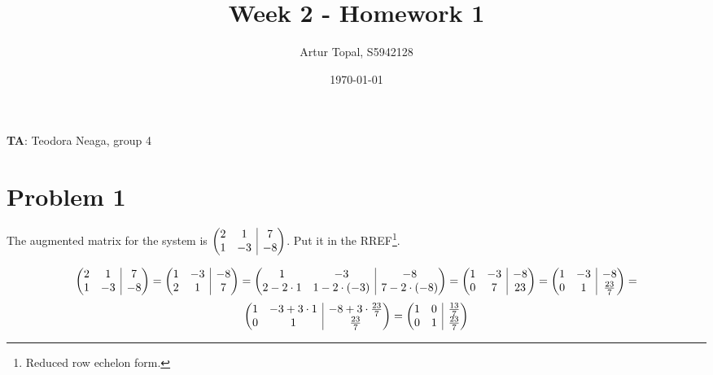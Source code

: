 \documentclass{article}
\title{Week 2 - Homework 1}
\author{Artur Topal, S5942128}
\date{\today}
\makeatletter
\newenvironment{amatrix}[1]{\left(\begin{array}{@{}*{#1}{c}|c@{}}}{\end{array}\right)}
\makeatother
\begin{document}
\maketitle

\begin{center}
  \textbf{TA}: Teodora Neaga, group 4
\end{center}

\pagebreak

\section{ Problem 1 } 

The augmented matrix for the system is $\begin{amatrix}{2} 2 & 1 & 7 \\  1 & -3 & -8 \end{amatrix}$. Put it in the RREF\footnote{Reduced row echelon form.}.

\begin{equation*}
  \begin{amatrix}{2} 2 & 1 & 7 \\  1 & -3 & -8 \end{amatrix} =
  \begin{amatrix}{2} 1 & -3 & -8 \\  2 & 1 & 7 \end{amatrix} =
  \begin{amatrix}{2} 1 & -3 & -8 \\  2 - 2 \cdot 1 & 1 - 2 \cdot (-3) & 7 - 2 \cdot (-8) \end{amatrix} =
  \begin{amatrix}{2} 1 & -3 & -8 \\  0 & 7 & 23 \end{amatrix} =
  \begin{amatrix}{2} 1 & -3 & -8 \\  0 & 1 & \frac{23}{7} \end{amatrix} = 
\end{equation*}
\begin{equation*}
  \begin{amatrix}{2} 1 & -3 + 3 \cdot 1 & -8 + 3 \cdot \frac{23}{7} \\  0 & 1 & \frac{23}{7} \end{amatrix} =
  \begin{amatrix}{2} 1 & 0 & \frac{13}{7} \\ 0 & 1 & \frac{23}{7} \end{amatrix}
\end{equation*}
\end{document}
